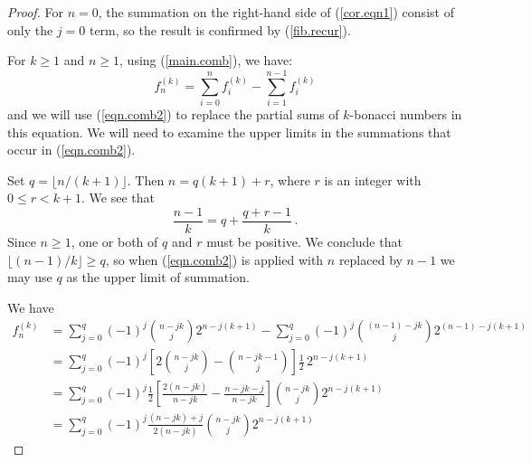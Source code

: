 \documentclass[10pt,a4paper]{amsart}
\begin{document}
\begin{proof} 
For $n= 0$, the summation on the right-hand side of  (\ref{cor.eqn1})
consist of only the $j=0$ term, so  the result is confirmed by (\ref{fib.recur}).

For  $k\geq 1$ and $n \geq 1$,
using (\ref{main.comb}), we have:
\[
f_{n}^{(k)}=
\sum_{i=0}^{n} f_i^{(k)} 
- \sum_{i=1}^{n-1} f_i^{(k)}
\]
and we will use    (\ref{eqn.comb2}) 
to replace the partial sums of  $k$-bonacci numbers in this equation.
We will  need to examine the upper limits in the summations that
occur  in  (\ref{eqn.comb2}).

Set $q = \lfloor n/(k+1)\rfloor $.  Then $n = q(k+1) + r$, where
$r$ is an integer with $0\leq r < k+1$.
We  see that 
$$
\frac{n-1}{k} = q + \frac{q+r-1}{k}
\,.
$$
Since $n\geq 1$, one or both of $q$ and $r$ must be positive.
We conclude that $\lfloor (n-1)/k \rfloor \geq q$, so
when    (\ref{eqn.comb2})  is applied with $n$ replaced by $n-1$
we may use $q$ as  the upper limit of summation.

We have
\begin{align}\nonumber
	f_{n}^{(k)} 
\nonumber
		&=\sum_{j=0}^{q} (-1)^{j} \binom{n-jk}{j}2^{n-j(k+1)} 
		- \sum_{j=0}^{q} (-1)^{j} \binom{(n-1)-jk}{j}2^{(n-1)-j(k+1)} \\
\nonumber %
		&=\sum_{j=0}^{q} (-1)^{j}  \left[ 2 \binom{n-jk}{j}- \binom{n-jk-1}{j} \right] \frac12\, 2^{n-j(k+1)} \\
\nonumber
		&=\sum_{j=0}^{q} (-1)^{j} 
		\frac12 \left[ \frac{2(n-jk)}{n-jk}  - \frac{n-jk-j}{n-jk} \right] \binom{n-jk}{j} 2^{n-j(k+1)} \\
\nonumber
		&=\sum_{j=0}^{q} (-1)^{j} 
	 \frac{(n-jk) + j}{2(n-jk)}  \binom{n-jk}{j} 2^{n-j(k+1)} 
\end{align}
	 

\end{proof}
\end{document}
